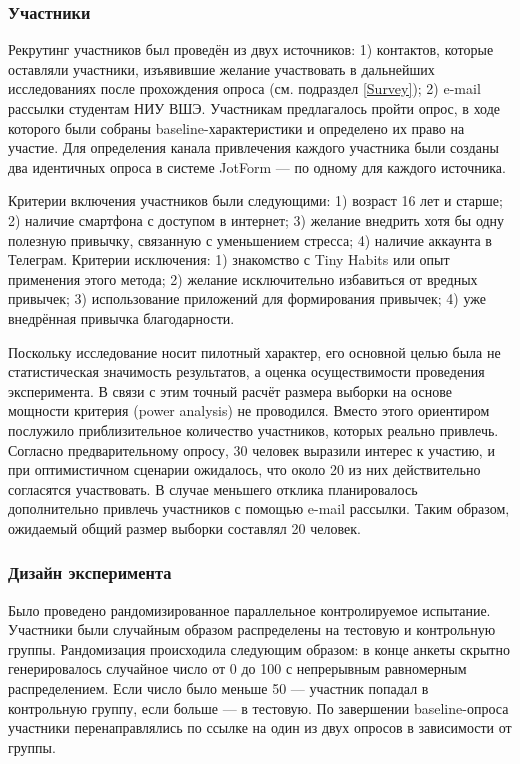 \documentclass[pdflatex,sn-mathphys-num]{sn-jnl}%
\theoremstyle{thmstyleone}%
\theoremstyle{thmstyletwo}%
\theoremstyle{thmstylethree}%
\begin{document}
\subsubsection{Участники}

Рекрутинг участников был проведён из двух источников: 1) контактов, которые оставляли участники, изъявившие желание участвовать в дальнейших исследованиях после прохождения опроса (см. подраздел \ref{Survey}); 2) e-mail рассылки студентам НИУ ВШЭ. Участникам предлагалось пройти опрос, в ходе которого были собраны baseline-характеристики и определено их право на участие. Для определения канала привлечения каждого участника были созданы два идентичных опроса в системе JotForm — по одному для каждого источника.

Критерии включения участников были следующими: 1) возраст 16 лет и старше; 2) наличие смартфона с доступом в интернет; 3) желание внедрить хотя бы одну полезную привычку, связанную с уменьшением стресса; 4) наличие аккаунта в Телеграм. Критерии исключения: 1) знакомство с Tiny Habits или опыт применения этого метода; 2) желание исключительно избавиться от вредных привычек; 3) использование приложений для формирования привычек; 4) уже внедрённая привычка благодарности.

Поскольку исследование носит пилотный характер, его основной целью была не статистическая значимость результатов, а оценка осуществимости проведения эксперимента. В связи с этим точный расчёт размера выборки на основе мощности критерия (power analysis) не проводился. Вместо этого ориентиром послужило приблизительное количество участников, которых реально привлечь. Согласно предварительному опросу, 30 человек выразили интерес к участию, и при оптимистичном сценарии ожидалось, что около 20 из них действительно согласятся участвовать. В случае меньшего отклика планировалось дополнительно привлечь участников с помощью e-mail рассылки. Таким образом, ожидаемый общий размер выборки составлял 20 человек.

\subsubsection{Дизайн эксперимента}

Было проведено рандомизированное параллельное контролируемое испытание. Участники были случайным образом распределены на тестовую и контрольную группы. Рандомизация происходила следующим образом: в конце анкеты скрытно генерировалось случайное число от 0 до 100 с непрерывным равномерным распределением. Если число было меньше 50 — участник попадал в контрольную группу, если больше — в тестовую. По завершении baseline-опроса участники перенаправлялись по ссылке на один из двух опросов в зависимости от группы.
\end{document}
